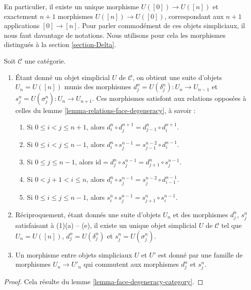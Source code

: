 \medskip\noindent
En particulier, il existe un unique morphisme $U([0]) \to U([n])$ et
exactement $n + 1$ morphismes $U([n]) \to U([0])$, correspondant aux
$n + 1$ applications $[0] \to [n]$. Pour parler commodément de ces
objets simpliciaux, il nous faut davantage de notations. Nous utilisons
pour cela les morphismes distingués à la section \ref{section-Delta}.

\begin{lemma}
\label{lemma-characterize-simplicial-object}
Soit $\mathcal{C}$ une catégorie.
\begin{enumerate}
\item Étant donné un objet simplicial $U$ de $\mathcal{C}$,
on obtient une suite d'objets $U_n = U([n])$ munis des morphismes
$d^n_j = U(\delta^n_j) : U_n \to U_{n-1}$ et
$s^n_j = U(\sigma^n_j) : U_n \to U_{n + 1}$. Ces morphismes
satisfont aux relations opposées à celles du lemme
\ref{lemma-relations-face-degeneracy}, à savoir :
\begin{enumerate}
\item Si $0 \leq i < j \leq n + 1$, alors
$d^n_i \circ d^{n + 1}_j = d^n_{j - 1} \circ d^{n + 1}_i$.
\item Si $0 \leq i < j \leq n - 1$, alors
$d^n_i \circ s^{n - 1}_j = s^{n - 2}_{j - 1} \circ d^{n - 1}_i$.
\item Si $0 \leq j \leq n - 1$, alors
$\text{id} = d^n_j \circ s^{n - 1}_j = d^n_{j + 1} \circ s^{n - 1}_j$.
\item Si $0 < j + 1 < i \leq n$, alors
$d^n_i \circ s^{n - 1}_j = s^{n - 2}_j \circ d^{n - 1}_{i - 1}$.
\item Si $0 \leq i \leq j \leq n - 1$, alors
$s^n_i \circ s^{n - 1}_j = s^n_{j + 1} \circ s^{n - 1}_i$.
\end{enumerate}
\item Réciproquement, étant donnés une suite d'objets $U_n$ et des
morphismes $d^n_j$, $s^n_j$ satisfaisant à (1)(a) -- (e), il existe un
unique objet simplicial $U$ de $\mathcal{C}$ tel que $U_n = U([n])$,
$d^n_j = U(\delta^n_j)$ et $s^n_j = U(\sigma^n_j)$.
\item Un morphisme entre objets simpliciaux $U$ et $U'$ est donné par une
famille de morphismes $U_n \to U'_n$ qui commutent aux morphismes
$d^n_j$ et $s^n_j$.
\end{enumerate}
\end{lemma}

\begin{proof}
Cela résulte du lemme \ref{lemma-face-degeneracy-category}.
\end{proof}


